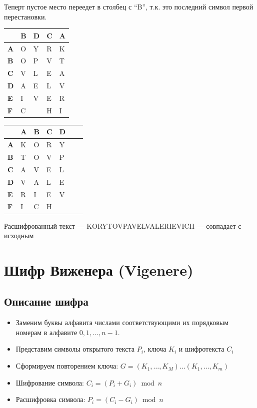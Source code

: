 \documentclass[a4paper, 14pt]{extarticle}
\begin{document}
\begin{enumerate}
    Теперт пустое место переедет в столбец с ``B'', т.к. это последний символ первой перестановки.
    \begin{table}[h]
        \centering
        \begin{tabular}{@{}l|llll@{}} %
        \textbf{} & \textbf{B} & \textbf{D} & \textbf{C} & \textbf{A} \\ \midrule
        \textbf{A} & O & Y & R & K \\
        \textbf{B} & O & P & V & T \\
        \textbf{C} & V & L & E & A \\
        \textbf{D} & A & E & L & V \\
        \textbf{E} & I & V & E & R \\
        \textbf{F} & C &  & H & I
        \end{tabular}%
        \hspace{2cm}
        \begin{tabular}{@{}l|llllll@{}} %
         & \textbf{A} & \textbf{B} & \textbf{C} & \textbf{D} \\ \midrule
        \textbf{A} & K & O & R & Y \\
        \textbf{B} & T & O & V & P \\
        \textbf{C} & A & V & E & L \\
        \textbf{D} & V & A & L & E \\
        \textbf{E} & R & I & E & V \\
        \textbf{F} & I & C & H &
        \end{tabular}%
    \end{table}
    
    Расшифрованный текст --- KORYTOVPAVELVALERIEVICH --- совпадает с исходным
\end{enumerate}

\FloatBarrier{}
\section{Шифр Виженера (Vigenere)}
\subsection{Описание шифра}
\begin{itemize}
    \item Заменим буквы алфавита числами соответствующими их порядковым номерам в алфавите $0, 1, \ldots, n-1$.
    \item Представим символы открытого текста $P_i$, ключа $K_i$ и шифротекста $C_i$
    \item Сформируем  повторением ключа: $G=(K_1, \ldots, K_M) \ldots (K_1, \ldots, K_m)$
    \item Шифрование символа: $C_i = (P_i + G_i) \bmod n$
    \item Расшифровка символа: $P_i = (C_i - G_i) \bmod n$
\end{itemize}
\end{document}
